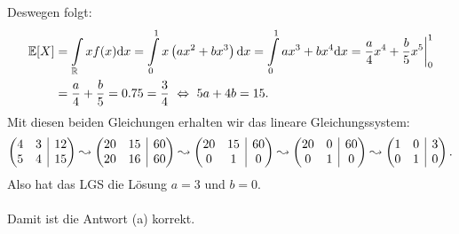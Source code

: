 Deswegen folgt:
\begin{align*}
	\mathbb{E}[X]
	&= 
	\int \limits_{\mathbb{R}} x f(x) \text{\rmfamily d} x
	= 
	\int \limits_0^1
	x\left(ax^2 + b x^3\right) \text{\rmfamily d} x
	=
	\int \limits_0^1
	ax^3 + b x^4\text{\rmfamily d} x
	=
	\frac{a}{4}x^4 + \frac{b}{5} x^5 \bigg|_{0}^1\\
	&=
	\frac{a}{4} + \frac{b}{5} = 0.75 = \frac{3}{4}
	\ \Leftrightarrow \
	5 a + 4 b = 15.
\end{align*}
Mit diesen beiden Gleichungen erhalten wir das lineare Gleichungssystem:
\begin{align*}
	\begin{pmatrix}
		4 & 3 & \BAR & 12\\
		5 & 4 & \BAR & 15
	\end{pmatrix}
	\leadsto
	\begin{pmatrix}
		20 & 15 & \BAR & 60\\
		20 & 16 & \BAR & 60
	\end{pmatrix}
	\leadsto
	\begin{pmatrix}
		20 & 15 & \BAR & 60\\
		0 & 1 & \BAR & 0
	\end{pmatrix}
	\leadsto
	\begin{pmatrix}
		20 & 0 & \BAR & 60\\
		0 & 1 & \BAR & 0
	\end{pmatrix}
	\leadsto
	\begin{pmatrix}
		1 & 0 & \BAR & 3\\
		0 & 1 & \BAR & 0
	\end{pmatrix}.
\end{align*}
Also hat das LGS die Lösung $ a = 3 $ und $ b = 0 $.\\
\\
Damit ist die Antwort (a) korrekt.
\newpage

